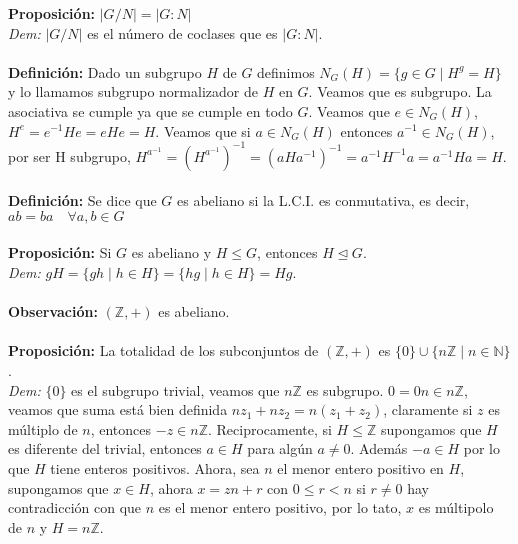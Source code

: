 \documentclass{article}
\begin{document}

\textbf{Proposición:} $|G/N|=|G:N|$\\
\textit{Dem:} $|G/N|$ es el número de coclases que es $|G:N|$.\\\\


\textbf{Definición:} Dado un subgrupo $H$ de $G$ definimos $N_G(H)=\{g\in G\mid H^g=H\}$ y lo llamamos subgrupo normalizador de $H$ en $G$. Veamos que es subgrupo. La asociativa se cumple ya que se cumple en todo $G$. Veamos que $e\in N_G(H)$, $H^e=e^{-1}He=eHe=H$. Veamos que si $a\in N_G(H)$ entonces $a^{-1}\in N_G(H)$, por ser H subgrupo, $H^{a^{-1}}=(H^{a^{-1}})^{-1}=(aHa^{-1})^{-1}=a^{-1}H^{-1}a=a^{-1}Ha=H$.\\\\


\textbf{Definición:} Se dice que $G$ es abeliano si la L.C.I. es conmutativa, es decir, $ab=ba\quad\forall a,b\in G$\\\\


\textbf{Proposición:} Si $G$ es abeliano y $H\le G$, entonces $H\trianglelefteq G$.\\
\textit{Dem:} $gH=\{gh\mid h\in H\}=\{hg\mid h\in H\}=Hg$.\\\\


\textbf{Observación:} $(\mathbb{Z},+)$ es abeliano.\\\\


\textbf{Proposición:} La totalidad de los subconjuntos de $(\mathbb{Z},+)$ es $\{0\}\cup\{n\mathbb{Z}\mid n\in\mathbb{N}\}$.\\
\textit{Dem:} $\{0\}$ es el subgrupo trivial, veamos que $n\mathbb{Z}$ es subgrupo. $0=0n\in n\mathbb{Z}$, veamos que suma está bien definida $nz_1+nz_2=n(z_1+z_2)$, claramente si $z$ es múltiplo de $n$, entonces $-z\in n\mathbb{Z}$. Reciprocamente, si $H\le\mathbb{Z}$ supongamos que $H$ es diferente del trivial, entonces $a\in H$ para algún $a\ne0$. Además $-a\in H$ por lo que $H$ tiene enteros positivos. Ahora, sea $n$ el menor entero positivo en $H$, supongamos que $x\in H$, ahora $x=zn+r$ con $0\le r<n$ si $r\ne 0$ hay contradicción con que $n$ es el menor entero positivo, por lo tato, $x$ es múltipolo de $n$ y $H=n\mathbb{Z}$.\\\\
\end{document}
